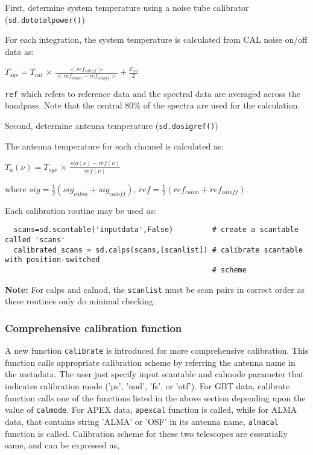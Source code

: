First, determine system temperature using a noise tube calibrator
({\tt sd.dototalpower()}) 

For each integration, the system temperature is calculated from
CAL noise on/off data as:

$ T_{sys} = T_{cal}$ $\times$ 
$\frac{<ref_{caloff}>}{<ref_{calon} - ref_{caloff}>} + \frac{T_{cal}}{2} $

{\tt ref} which refers to reference data and the spectral data are averaged
across the bandpass.  Note that the central 80\% of the spectra are
used for the calculation.

Second, determine antenna temperature ({\tt sd.dosigref()})

The antenna temperature for each channel is calculated as:

$ T_a(\nu) = T_{sys}$ $\times$ 
$\frac{sig(\nu) - ref(\nu)}{ref(\nu)}$

where $sig = \frac{1}{2}(sig_{calon} + sig_{caloff})$, 
      $ref = \frac{1}{2}(ref_{calon} + ref_{caloff}).$


Each calibration routine may be used as:


\small
\begin{verbatim}
  scans=sd.scantable('inputdata',False)         # create a scantable called 'scans'
  calibrated_scans = sd.calps(scans,[scanlist]) # calibrate scantable with position-switched 
                                                # scheme
\end{verbatim}
\normalsize


{\bf Note:} For calps and calnod, the {\tt scanlist} must be scan pairs in
correct order as these routines only do minimal checking.

\subsubsection{Comprehensive calibration function}
A new function {\tt calibrate} is introduced for more comprehensive
calibration. This function calls appropriate calibration scheme by
referring the antenna name in the metadata. The user just specify input
scantable and calmode parameter that indicates calibration mode ('ps',
'nod', 'fs', or 'otf'). For GBT data, calibrate function calls one of
the functions listed in the above section depending upon the value of
{\tt calmode}. For APEX data, {\tt apexcal} function is called, while for ALMA
data, that contains string 'ALMA' or 'OSF' in its antenna name, {\tt almacal}
function is called. Calibration scheme for these two telescopes are
essentially same, and can be expressed as,

